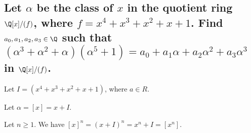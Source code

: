 \section[Problem 1]{}
    \subsection[(i)]{Let $\alpha$ be the class of $x$ in the quotient ring $\Q[x]/(f)$, where 
        $f = x^4 + x^3 + x^2 + x+1$. Find $a_0,a_1,a_2,a_3 \in \Q$ such that 
        $(\alpha^3 + \alpha ^2 + \alpha)(\alpha^5 + 1) = a_0+a_1\alpha +a_2\alpha^2+a_3\alpha^3$
        in $\Q[x] / (f)$.
    }

        Let $I = (x^4 + x^3 + x^2 + x+1)$, where $a \in R$.

        Let $\alpha = [x] = x + I$.

        Let $n \geq 1$.
        We have $[x]^n = (x+I)^n = x^n + I = [x^n]$.        


